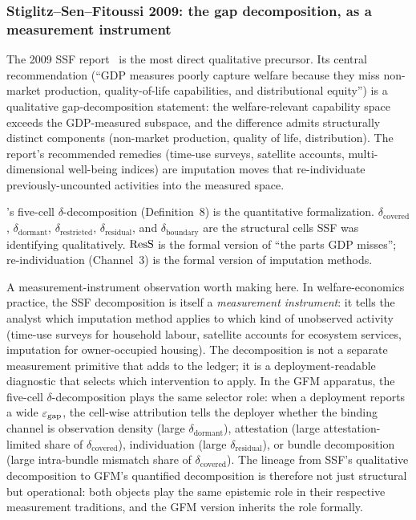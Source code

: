 \subsubsection{Stiglitz--Sen--Fitoussi 2009: the gap decomposition, as a measurement instrument}

The 2009 SSF report~\citep{stiglitz2009report} is the most
direct qualitative precursor.  Its central recommendation
(``GDP measures poorly capture welfare because they miss
non-market production, quality-of-life capabilities, and
distributional equity'') is a qualitative gap-decomposition
statement: the
welfare-relevant capability space exceeds the GDP-measured
subspace, and the difference admits structurally distinct
components (non-market production, quality of life, distribution).
The report's recommended remedies (time-use surveys, satellite
accounts, multi-dimensional well-being indices) are imputation
moves that re-individuate previously-uncounted activities into the
measured space.

\citep[Need~Sufficiency]{lasser2026paper8b}'s
five-cell $\delta$-decomposition (Definition~8) is the
quantitative formalization.  $\delta_{\mathrm{covered}}$,
$\delta_{\mathrm{dormant}}$, $\delta_{\mathrm{restricted}}$,
$\delta_{\mathrm{residual}}$, and $\delta_{\mathrm{boundary}}$
are the structural cells SSF was identifying qualitatively.
$\mathrm{ResS}$ is the formal version of ``the parts GDP misses'';
re-individuation (Channel~3) is the formal version of imputation
methods.

A measurement-instrument observation worth making here.  In
welfare-economics practice, the SSF decomposition is itself a
\emph{measurement instrument}: it tells the analyst which
imputation method applies to which kind of unobserved activity
(time-use surveys for household labour, satellite accounts for
ecosystem services, imputation for owner-occupied housing).  The
decomposition is not a separate measurement primitive that adds
to the ledger; it is a deployment-readable diagnostic that
selects which intervention to apply.  In the GFM apparatus, the
five-cell $\delta$-decomposition plays the same selector role:
when a deployment reports a wide $\varepsilon_{\mathrm{gap}}$, the cell-wise
attribution tells the deployer whether the binding channel is
observation density (large $\delta_{\mathrm{dormant}}$),
attestation (large attestation-limited share of
$\delta_{\mathrm{covered}}$), individuation (large
$\delta_{\mathrm{residual}}$), or bundle decomposition (large
intra-bundle mismatch share of $\delta_{\mathrm{covered}}$).
The lineage from SSF's qualitative decomposition to GFM's
quantified decomposition is therefore not just structural but
operational: both objects play the same epistemic role in their
respective measurement traditions, and the GFM version inherits
the role formally.

